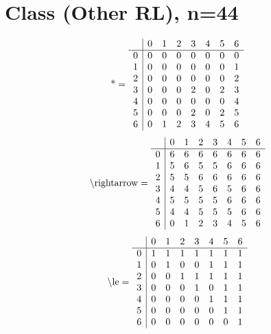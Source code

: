\documentclass[11pt]{article}
\begin{document}
\section{Class (Other RL), n=44}
\[\text{*} = 
\begin{array}{r | r r r r r r r}
 & 0 & 1 & 2 & 3 & 4 & 5 & 6 \\ \hline
0 & 0 & 0 & 0 & 0 & 0 & 0 & 0 \\
1 & 0 & 0 & 0 & 0 & 0 & 0 & 1 \\
2 & 0 & 0 & 0 & 0 & 0 & 0 & 2 \\
3 & 0 & 0 & 0 & 2 & 0 & 2 & 3 \\
4 & 0 & 0 & 0 & 0 & 0 & 0 & 4 \\
5 & 0 & 0 & 0 & 2 & 0 & 2 & 5 \\
6 & 0 & 1 & 2 & 3 & 4 & 5 & 6 \\
\end{array}
\]
\[\text{\textbackslash rightarrow} = 
\begin{array}{r | r r r r r r r}
 & 0 & 1 & 2 & 3 & 4 & 5 & 6 \\ \hline
0 & 6 & 6 & 6 & 6 & 6 & 6 & 6 \\
1 & 5 & 6 & 5 & 5 & 6 & 6 & 6 \\
2 & 5 & 5 & 6 & 6 & 6 & 6 & 6 \\
3 & 4 & 4 & 5 & 6 & 5 & 6 & 6 \\
4 & 5 & 5 & 5 & 5 & 6 & 6 & 6 \\
5 & 4 & 4 & 5 & 5 & 5 & 6 & 6 \\
6 & 0 & 1 & 2 & 3 & 4 & 5 & 6 \\
\end{array}
\]
\[\text{\textbackslash le} = 
\begin{array}{r | r r r r r r r}
 & 0 & 1 & 2 & 3 & 4 & 5 & 6 \\ \hline
0 & 1 & 1 & 1 & 1 & 1 & 1 & 1 \\
1 & 0 & 1 & 0 & 0 & 1 & 1 & 1 \\
2 & 0 & 0 & 1 & 1 & 1 & 1 & 1 \\
3 & 0 & 0 & 0 & 1 & 0 & 1 & 1 \\
4 & 0 & 0 & 0 & 0 & 1 & 1 & 1 \\
5 & 0 & 0 & 0 & 0 & 0 & 1 & 1 \\
6 & 0 & 0 & 0 & 0 & 0 & 0 & 1 \\
\end{array}
\]
\end{document}
